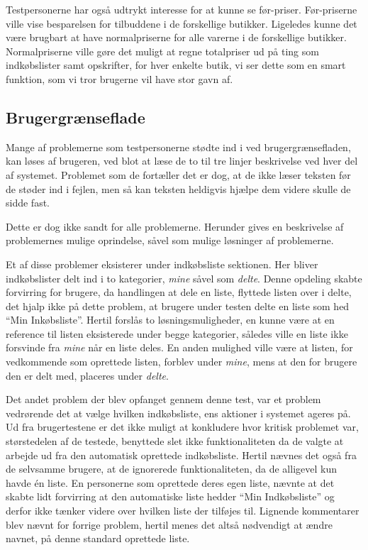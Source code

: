 Testpersonerne har også udtrykt interesse for at kunne se før-priser.
Før-priserne ville vise besparelsen for tilbuddene i de forskellige butikker.
Ligeledes kunne det være brugbart at  have normalpriserne for alle varerne i de forskellige butikker.
Normalpriserne ville gøre det muligt at regne totalpriser ud på ting som indkøbslister samt opskrifter, for hver enkelte butik, vi ser dette som en smart funktion, som vi tror brugerne vil have stor gavn af.

\subsection{Brugergrænseflade}
Mange af problemerne som testpersonerne stødte ind i ved brugergrænsefladen, kan løses af brugeren, ved blot at læse de to til tre linjer beskrivelse ved hver del af systemet.
Problemet som de fortæller det er dog, at de ikke læser teksten før de støder ind i fejlen, men så kan teksten heldigvis hjælpe dem videre skulle de sidde fast.

Dette er dog ikke sandt for alle problemerne.
Herunder gives en beskrivelse af problemernes mulige oprindelse, såvel som mulige løsninger af problemerne.

Et af disse problemer eksisterer under indkøbsliste sektionen.
Her bliver indkøbslister delt ind i to kategorier, \textit{mine} såvel som \textit{delte}.
Denne opdeling skabte forvirring for brugere, da handlingen at dele en liste, flyttede listen over i delte, det hjalp ikke på dette problem, at brugere under testen delte en liste som hed ``Min Inkøbsliste''.
Hertil forslås to løsningsmuligheder, en kunne være at en reference til listen eksisterede under begge kategorier, således ville en liste ikke forsvinde fra \textit{mine} når en liste deles.
En anden mulighed ville være at listen, for vedkommende som oprettede listen, forblev under \textit{mine}, mens at den for brugere den er delt med, placeres under \textit{delte}.

Det andet problem der blev opfanget gennem denne test, var et problem vedrørende det at vælge hvilken indkøbsliste, ens aktioner i systemet ageres på.
Ud fra brugertestene er det ikke muligt at konkludere hvor kritisk problemet var, størstedelen af de testede, benyttede slet ikke funktionaliteten da de valgte at arbejde ud fra den automatisk oprettede indkøbsliste.
Hertil nævnes det også fra de selvsamme brugere, at de ignorerede funktionaliteten, da de alligevel kun havde én liste.
En personerne som oprettede deres egen liste, nævnte at det skabte lidt forvirring at den automatiske liste hedder ``Min Indkøbsliste'' og derfor ikke tænker videre over hvilken liste der tilføjes til.
Lignende kommentarer blev nævnt for forrige problem, hertil menes det altså nødvendigt at ændre navnet, på denne standard oprettede liste.

